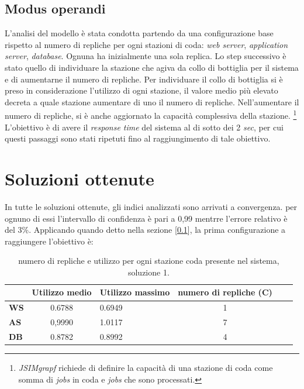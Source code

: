 \documentclass[../main.tex]{subfiles}
\begin{document}
    \subsection{Modus operandi}\label{subsec:modus-operandi}
    L'analisi del modello è stata condotta partendo da una configurazione base rispetto al numero di repliche per ogni
    stazioni di coda: \textit{web server}, \textit{application server}, \textit{database}. Ognuna ha inizialmente una
    sola replica.
    Lo step successivo è stato quello di individuare la stazione che agiva da collo di bottiglia per il sistema e di
    aumentarne il numero di repliche.
    Per individuare il collo di bottiglia si è preso in considerazione l'utilizzo di ogni stazione, il valore medio più
    elevato decreta a quale stazione aumentare di uno il numero di repliche.
    Nell'aumentare il numero di repliche, si è anche aggiornato la capacità complessiva della stazione.
    \footnote{\textit{JSIMgrapf} richiede di definire la capacità di una stazione di coda come somma di \textit{jobs} in
    coda e \textit{jobs} che sono processati.}
    L'obiettivo è di avere il \textit{response time} del sistema al di sotto dei 2 \textit{sec}, per cui questi passaggi
    sono stati ripetuti fino al raggiungimento di tale obiettivo.


    \section{Soluzioni ottenute}\label{sec:soluzioni-ottenute}
    In tutte le soluzioni ottenute, gli indici analizzati sono arrivati a convergenza. per ognuno di essi l'intervallo
    di confidenza è pari a 0,99 mentrre l'errore relativo è del 3\%.
    \newline
    Applicando quando detto nella sezione [\ref{subsec:modus-operandi}], la prima configurazione a raggiungere
    l'obiettivo è:
    \begin{table}[h]
        \centering
        \begin{tabular}{|l|c|l|c|l|c}
            \hline
            & \textbf{Utilizzo medio} & \textbf{Utilizzo massimo} & \textbf{numero di repliche (C)}  \\ [0.5ex]
            \hline
            \textbf{WS} & 0.6788                  & 0.6949                    & 1                               \\
            \textbf{AS} & 0,9990                  & 1.0117                    & 7                               \\
            \textbf{DB} & 0.8782                  & 0.8992                    & 4                               \\
            \hline
        \end{tabular}
        \caption{numero di repliche e utilizzo per ogni stazione coda presente nel sistema, soluzione 1.}
        \label{tab:valori-soluzione-1-del-problema}
    \end{table}
\end{document}
